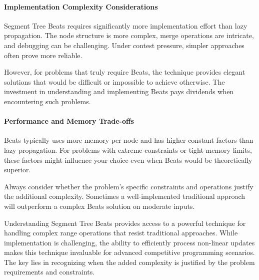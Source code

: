 \paragraph{Implementation Complexity Considerations}

Segment Tree Beats requires significantly more implementation effort than lazy propagation. The node structure is more complex, merge operations are intricate, and debugging can be challenging. Under contest pressure, simpler approaches often prove more reliable.

However, for problems that truly require Beats, the technique provides elegant solutions that would be difficult or impossible to achieve otherwise. The investment in understanding and implementing Beats pays dividends when encountering such problems.


\paragraph{Performance and Memory Trade-offs}

Beats typically uses more memory per node and has higher constant factors than lazy propagation. For problems with extreme constraints or tight memory limits, these factors might influence your choice even when Beats would be theoretically superior.

Always consider whether the problem's specific constraints and operations justify the additional complexity. Sometimes a well-implemented traditional approach will outperform a complex Beats solution on moderate inputs.

Understanding Segment Tree Beats provides access to a powerful technique for handling complex range operations that resist traditional approaches. While implementation is challenging, the ability to efficiently process non-linear updates makes this technique invaluable for advanced competitive programming scenarios. The key lies in recognizing when the added complexity is justified by the problem requirements and constraints.